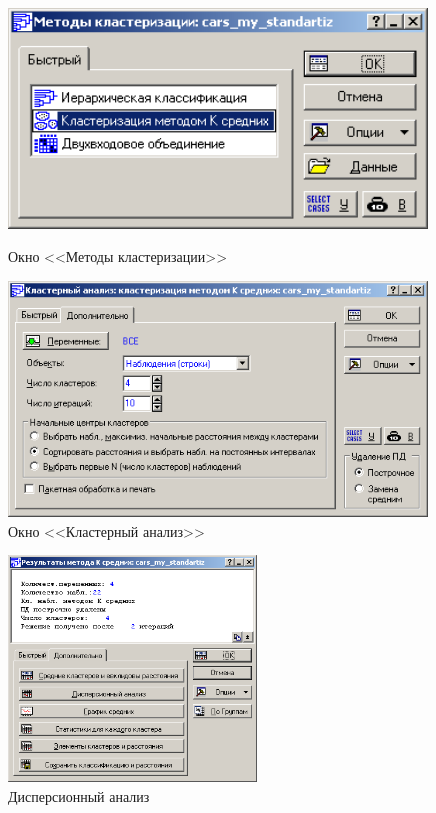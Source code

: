 \begin{figure}[!h]
  \centering
  \begin{minipage}{0.49\textwidth}
    \centering

    \includegraphics[width=0.99\textwidth]
    {inc/cars_my/2.1.PNG}

    \caption{Окно <<Методы кластеризации>>}
    \label{fig:2_1}
  \end{minipage}
  \begin{minipage}{0.49\textwidth}
    \centering

    \includegraphics[width=0.99\textwidth]
    {inc/cars_my/2.2.PNG}

    \caption{Окно <<Кластерный анализ>>}
    \label{fig:2_2}
  \end{minipage}
\end{figure}

\begin{figure}[!h]
  \centering

  \includegraphics[height=6cm]
  {inc/cars_my/2.3.PNG}

  \caption{Дисперсионный анализ}
  \label{fig:2_3}
\end{figure}

